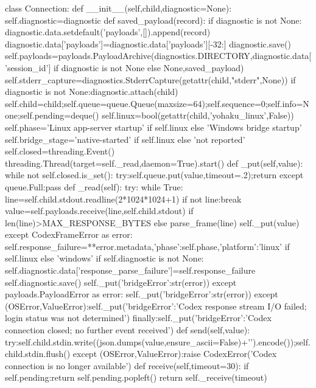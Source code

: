 class Connection:
    def __init__(self,child,diagnostic=None):
        self.diagnostic=diagnostic
        def saved_payload(record):
            if diagnostic is not None:
                diagnostic.data.setdefault('payloads',[]).append(record)
                diagnostic.data['payloads']=diagnostic.data['payloads'][-32:]
                diagnostic.save()
        self.payloads=payloads.PayloadArchive(diagnostics.DIRECTORY,diagnostic.data['session_id'] if diagnostic is not None else None,saved_payload)
        self.stderr_capture=diagnostics.StderrCapture(getattr(child,"stderr",None))
        if diagnostic is not None:diagnostic.attach(child)
        self.child=child;self.queue=queue.Queue(maxsize=64);self.sequence=0;self.info=None;self.pending=deque()
        self.linux=bool(getattr(child,'yohaku_linux',False))
        self.phase='Linux app-server startup' if self.linux else 'Windows bridge startup'
        self.bridge_stage='native-started' if self.linux else 'not reported'
        self.closed=threading.Event()
        threading.Thread(target=self._read,daemon=True).start()
    def _put(self,value):
        while not self.closed.is_set():
            try:self.queue.put(value,timeout=.2);return
            except queue.Full:pass
    def _read(self):
        try:
            while True:
                line=self.child.stdout.readline(2*1024*1024+1)
                if not line:break
                value=self.payloads.receive(line,self.child.stdout) if len(line)>MAX_RESPONSE_BYTES else parse_frame(line)
                self._put(value)
        except CodexFrameError as error:
            self.response_failure={**error.metadata,'phase':self.phase,'platform':'linux' if self.linux else 'windows'}
            if self.diagnostic is not None:
                self.diagnostic.data['response_parse_failure']=self.response_failure
                self.diagnostic.save()
            self._put({'bridgeError':str(error)})
        except payloads.PayloadError as error:
            self._put({'bridgeError':str(error)})
        except (OSError,ValueError):self._put({'bridgeError':'Codex response stream I/O failed; login status was not determined'})
        finally:self._put({'bridgeError':'Codex connection closed; no further event received'})
    def send(self,value):
        try:self.child.stdin.write((json.dumps(value,ensure_ascii=False)+'\n').encode());self.child.stdin.flush()
        except (OSError,ValueError):raise CodexError('Codex connection is no longer available')
    def receive(self,timeout=30):
        if self.pending:return self.pending.popleft()
        return self._receive(timeout)

